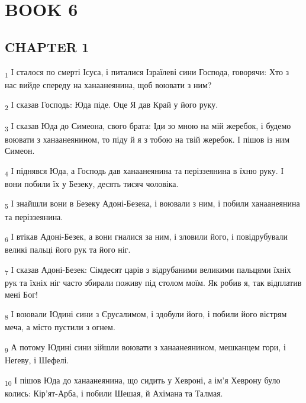 \section{BOOK 6}
\subsection{CHAPTER 1}
\begin{tcolorbox}
\textsubscript{1} І сталося по смерті Ісуса, і питалися Ізраїлеві сини Господа, говорячи: Хто з нас вийде спереду на ханаанеянина, щоб воювати з ним?
\end{tcolorbox}
\begin{tcolorbox}
\textsubscript{2} І сказав Господь: Юда піде. Оце Я дав Край у його руку.
\end{tcolorbox}
\begin{tcolorbox}
\textsubscript{3} І сказав Юда до Симеона, свого брата: Іди зо мною на мій жеребок, і будемо воювати з ханаанеянином, то піду й я з тобою на твій жеребок. І пішов із ним Симеон.
\end{tcolorbox}
\begin{tcolorbox}
\textsubscript{4} І піднявся Юда, а Господь дав ханаанеянина та періззеянина в їхню руку. І вони побили їх у Безеку, десять тисяч чоловіка.
\end{tcolorbox}
\begin{tcolorbox}
\textsubscript{5} І знайшли вони в Безеку Адоні-Безека, і воювали з ним, і побили ханаанеянина та періззеянина.
\end{tcolorbox}
\begin{tcolorbox}
\textsubscript{6} І втікав Адоні-Безек, а вони гналися за ним, і зловили його, і повідрубували великі пальці його рук та його ніг.
\end{tcolorbox}
\begin{tcolorbox}
\textsubscript{7} І сказав Адоні-Безек: Сімдесят царів з відрубаними великими пальцями їхніх рук та їхніх ніг часто збирали поживу під столом моїм. Як робив я, так відплатив мені Бог!
\end{tcolorbox}
\begin{tcolorbox}
\textsubscript{8} І воювали Юдині сини з Єрусалимом, і здобули його, і побили його вістрям меча, а місто пустили з огнем.
\end{tcolorbox}
\begin{tcolorbox}
\textsubscript{9} А потому Юдині сини зійшли воювати з ханаанеянином, мешканцем гори, і Неґеву, і Шефелі.
\end{tcolorbox}
\begin{tcolorbox}
\textsubscript{10} І пішов Юда до ханаанеянина, що сидить у Хевроні, а ім'я Хеврону було колись: Кір'ят-Арба, і побили Шешая, й Ахімана та Талмая.
\end{tcolorbox}
